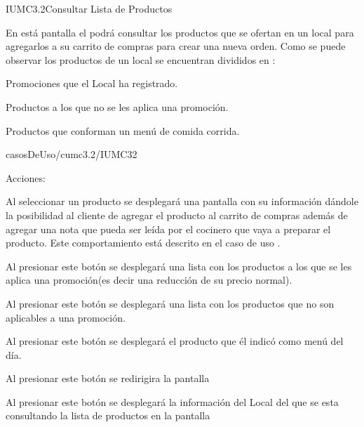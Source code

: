\begin{IU}{IUMC3.2}{Consultar Lista de Productos}{En está pantalla el  podrá consultar los productos que se ofertan en un local para agregarlos a su carrito de compras para crear una nueva orden. Como se puede observar los productos de un local se encuentran divididos en :\begin{Citemize}
		\item Promociones que el Local ha registrado.
		\item Productos a los que no se les aplica una promoción.
		\item Productos que conforman un menú de comida corrida.
	\end{Citemize}}{casosDeUso/cumc3.2/IUMC32}
	\item[Acciones:]\hspace{1pt}
		\begin{Citemize}
		\item Al seleccionar un producto se desplegará una pantalla con su información dándole la posibilidad al cliente de agregar el producto al carrito de compras además de agregar una nota que pueda ser leída por el cocinero que vaya a preparar el producto. Este comportamiento está descrito en el caso de uso .
		\item {} Al presionar este botón se desplegará una lista con los productos a los que se les aplica una promoción(es decir una reducción de su precio normal).
		\item {} Al presionar este botón se desplegará una lista con los productos que no son aplicables a una promoción.
		\item {} Al presionar este botón se desplegará el producto que él  indicó como menú del día.
		\item \backIcon{} Al presionar este botón se redirigira la pantalla 
		\item {} Al presionar este botón se desplegará la información del Local del que se esta consultando la lista de productos en la pantalla 
	\end{Citemize}
\end{IU}
